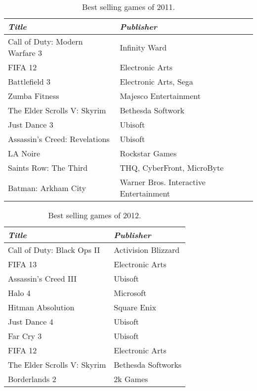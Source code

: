 \begin{table*}[ht]
	\begin{tabular}{p{15em} p{13em}}
		\toprule
		\emph{Title} & \emph{Publisher}\\
		\midrule
	Call of Duty: Modern Warfare 3 & Infinity Ward
	\\
	FIFA 12 & Electronic Arts
	\\
	Battlefield 3 & Electronic Arts, Sega
	\\
	Zumba Fitness & Majesco Entertainment
	\\
	The Elder Scrolls V: Skyrim & Bethesda Softwork
	\\
	Just Dance 3 & Ubisoft
	\\
	Assassin's Creed: Revelations & Ubisoft
	\\
	LA Noire & Rockstar Games
	\\
	Saints Row: The Third & THQ, CyberFront, MicroByte
	\\
	Batman: Arkham City & Warner Bros. Interactive Entertainment 
	\\
	\bottomrule
	\end{tabular}
	\caption{Best selling games of 2011.}
	\label{tab:bestSellingGames2011}
\end{table*}

\begin{table*}[ht]
	\begin{tabular}{p{15em} p{13em}}
		\toprule
		\emph{Title} & \emph{Publisher}\\
		\midrule
	Call of Duty: Black Ops II & Activision Blizzard
	\\
	FIFA 13 & Electronic Arts
	\\
	Assassin's Creed III & Ubisoft
	\\
    Halo 4 & Microsoft	
    \\
	Hitman Absolution & Square Enix
	\\
	Just Dance 4 & Ubisoft
	\\
	Far Cry 3 & Ubisoft
	\\
	FIFA 12 & Electronic Arts
	\\
	The Elder Scrolls V: Skyrim & Bethesda Softworks
	\\
	Borderlands 2 & 2k Games
	\\
	
	\bottomrule
	\end{tabular}
	\caption{Best selling games of 2012.}
	\label{tab:bestSellingGames2012}
\end{table*}

